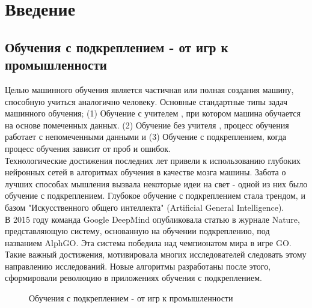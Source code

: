 \documentclass[a4paper,12pt]{article}
\begin{document}
\newpage
\section{Введение}
\subsection{Обучения с подкреплением - от игр к промышленности}
Целью машинного обучения является частичная или полная создания машину, способную учиться аналогично человеку. Основные стандартные типы задач машинного обучения; (1) Обучение с учителем , при котором машина обучается на основе помеченных данных. (2) Обучение без учителя , процесс обучения работает с непомеченными данными и (3) Обучение с подкреплением, когда процесс обучения зависит от проб и ошибок.\\

Технологические достижения последних лет привели к использованию глубоких нейронных сетей в алгоритмах обучения в качестве мозга машины. Забота о лучших способах мышления вызвала некоторые идеи на свет - одной из них было обучение с подкреплением. Глубокое обучение с подкреплением стала трендом, и базом "Искусственного общего интеллекта" (Artificial General Intelligence).\\

В 2015 году команда Google DeepMind опубликовала статью в журнале Nature, представляющую систему, основанную на обучении подкреплению, под названием AlphGO. Эта система победила над чемпионатом мира в игре GO. Такие важный достижения, мотивировала многих исследователей следовать этому направлению исследований. Новые алгоритмы разработаны после этого, сформировали революцию в приложениях обучения с подкреплением.\\
\begin{figure}[H]
    \centering
    \caption{Обучения с подкреплением - от игр к промышленности}
    \label{fig:my_label}
\end{figure}
\end{document}
